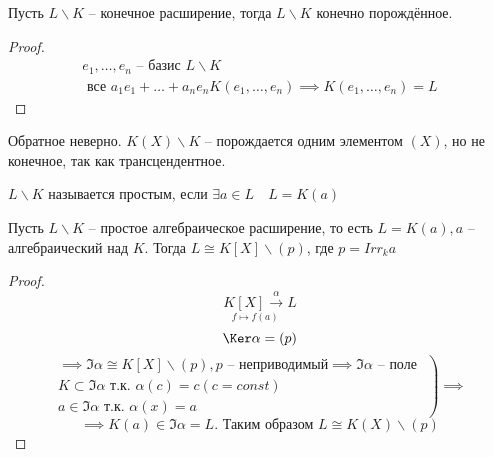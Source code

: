 \documentclass[main]{subfiles}
\begin{document}
\begin{proposition}
    Пусть $L \backslash K$ -- конечное  расширение, тогда $L \backslash K$ конечно порождённое.
\end{proposition}
\begin{proof}
    \begin{gather*}
        e_1, \ldots , e_n \text{ -- базис } L \backslash K \\
        \text{ все } a_1e_1 + \ldots + a_ne_n  K(e_1, \ldots, e_n)  \implies K(e_1, \ldots, e_n) = L 
    \end{gather*}
\end{proof}
\begin{remark}
    Обратное неверно. $K(X) \backslash K$ -- порождается одним элементом $(X)$, но не конечное, так как трансцендентное.
\end{remark}

\begin{definition}
    $L \backslash K$ называется простым, если $\exists a \in L \quad L = K(a)$
\end{definition}

\begin{proposition}
    Пусть $L \backslash K$ -- простое алгебраическое расширение, то есть $L = K(a), a$ -- алгебраический над $K$.
    Тогда $L \cong K[X] \backslash (p)$, где $p = Irr_k a$
\end{proposition}

\begin{proof}
    \[ \underset{f \mapsto f(a)}{K[X] \stackrel{\alpha}{\longrightarrow}} L \]
    \[ \Ker \alpha = (p) \] 
    \[  \left. \begin{gathered}
        \implies \Im \alpha \cong K[X] \backslash (p), p \text{ -- неприводимый} \implies \Im \alpha \text{ -- поле } \\
        K \subset \Im \alpha \text{ т.к. } \alpha(c) = c (c = const) \\
        a \in \Im \alpha \text{ т.к. } \alpha(x) = a
    \end{gathered} \right) \implies \]
    \[\implies K(a) \in \Im \alpha = L. \text{ Таким образом } L \cong K(X)  \backslash (p) \]
\end{proof}
\end{document}
